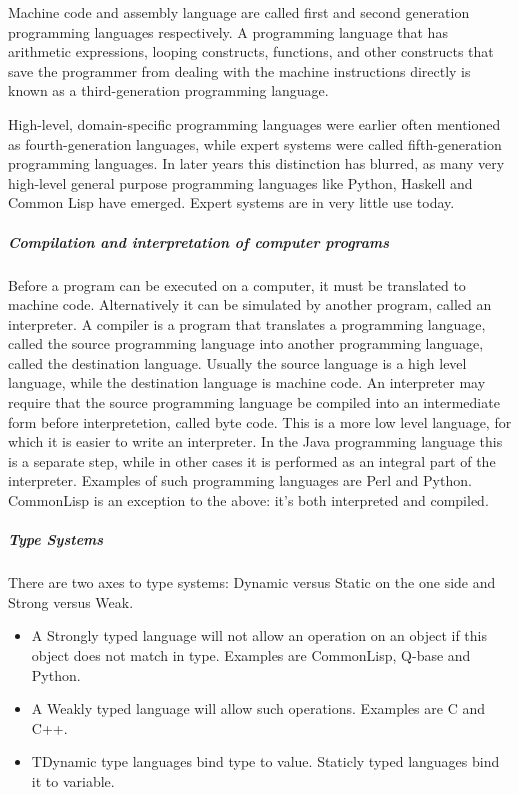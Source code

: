 Machine code and assembly language are called first and second generation programming languages respectively. A programming language that has arithmetic expressions, looping constructs, functions, and other constructs that save the programmer from dealing with the machine instructions directly is known as a third-generation programming language.

High-level, domain-specific programming languages were earlier often mentioned as fourth-generation languages, while expert systems were called fifth-generation programming languages. In later years this distinction has blurred, as many very high-level general purpose programming languages like Python, Haskell and Common Lisp have emerged. Expert systems are in very little use today.

\subparagraph*{Compilation and interpretation of computer programs}
\hfill \break
Before a program can be executed on a computer, it must be translated to machine code. Alternatively it can be simulated by another program, called an interpreter. A compiler is a program that translates a programming language, called the source programming language into another programming language, called the destination language. Usually the source language is a high level language, while the destination language is machine code. An interpreter may require that the source programming language be compiled into an intermediate form before interpretetion, called byte code. This is a more low level language, for which it is easier to write an interpreter. In the Java programming language this is a separate step, while in other cases it is performed as an integral part of the interpreter. Examples of such programming languages are Perl and Python. CommonLisp is an exception to the above: it's both interpreted and compiled.

\subparagraph*{Type Systems}
\hfill \break
There are two axes to type systems: Dynamic versus Static on the one side and Strong versus Weak.

\begin{itemize}
  \item A Strongly typed language will not allow an operation on an object if this object does not match in type. Examples are CommonLisp, Q-base and Python.
  \item A Weakly typed language will allow such operations. Examples are C and C++.
  \item TDynamic type languages bind type to value. Staticly typed languages bind it to variable.
\end{itemize}

